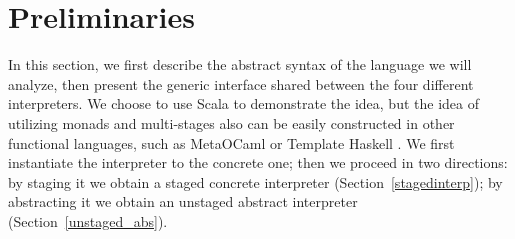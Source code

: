 \newcommand{\TLang}{$L_\lambda$}

\section{Preliminaries}

In this section, we first describe the abstract syntax of the language we will
analyze, then present the generic interface shared between the four different
interpreters. We choose to use Scala to demonstrate the idea, but the idea of
utilizing monads and multi-stages also can be easily constructed in other functional
languages, such as MetaOCaml \cite{DBLP:conf/gpce/CalcagnoTHL03,
  DBLP:conf/flops/Kiselyov14} or Template Haskell \cite{Sheard:2002:TMH:636517.636528} .
We first instantiate the interpreter to the concrete one; then we
proceed in two directions: by staging it we obtain a staged concrete interpreter
(Section~\ref{stagedinterp}); by abstracting it we obtain an unstaged abstract
interpreter (Section~\ref{unstaged_abs}).




